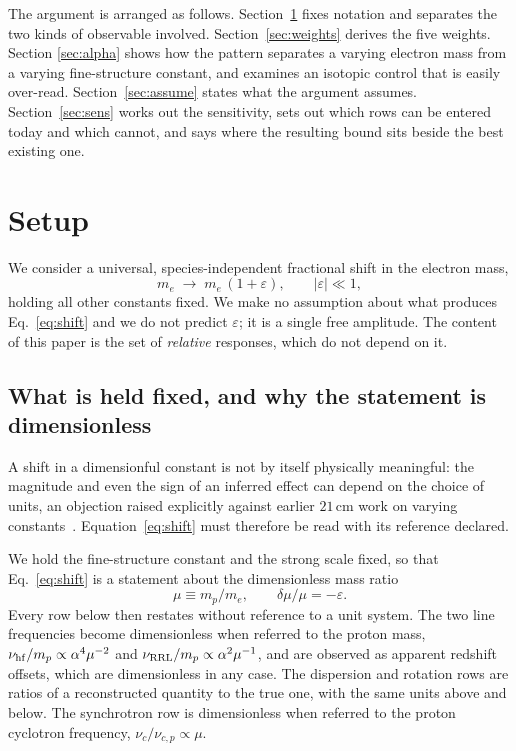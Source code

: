 \documentclass[aps,prd,twocolumn,superscriptaddress,nofootinbib,10pt]{revtex4-2}
\begin{document}
The argument is arranged as follows. Section~\ref{sec:setup} fixes notation and separates the two
kinds of observable involved. Section~\ref{sec:weights} derives the five weights. Section
\ref{sec:alpha} shows how the pattern separates a varying electron mass from a varying
fine-structure constant, and examines an isotopic control that is easily over-read.
Section~\ref{sec:assume} states what the argument assumes. Section~\ref{sec:sens} works out the
sensitivity, sets out which rows can be entered today and which cannot, and says where the
resulting bound sits beside the best existing one.

\section{Setup}\label{sec:setup}

We consider a universal, species-independent fractional shift in the electron mass,
%
\begin{equation}
  m_e \;\longrightarrow\; m_e\,(1+\varepsilon), \qquad |\varepsilon| \ll 1 ,
  \label{eq:shift}
\end{equation}
%
holding all other constants fixed. We make no assumption about what produces
Eq.~\eqref{eq:shift} and we do not predict $\varepsilon$; it is a single free amplitude. The
content of this paper is the set of \emph{relative} responses, which do not depend on it.

\subsection{What is held fixed, and why the statement is dimensionless}

A shift in a dimensionful constant is not by itself physically meaningful: the magnitude and even
the sign of an inferred effect can depend on the choice of units, an objection raised explicitly
against earlier $21\,$cm work on varying constants~\cite{FlambaumPorsev2010,KhatriWandelt2007,
KhatriWandelt2010}. Equation~\eqref{eq:shift} must therefore be read with its reference declared.

We hold the fine-structure constant and the strong scale fixed, so that Eq.~\eqref{eq:shift} is a
statement about the dimensionless mass ratio
%
\begin{equation}
  \mu \equiv m_p/m_e, \qquad \delta\mu/\mu = -\varepsilon .
  \label{eq:mu}
\end{equation}
%
Every row below then restates without reference to a unit system. The two line frequencies become
dimensionless when referred to the proton mass, $\nu_{\rm hf}/m_p \propto \alpha^{4}\mu^{-2}$ and
$\nu_{\rm RRL}/m_p \propto \alpha^{2}\mu^{-1}$, and are observed as apparent redshift offsets, which
are dimensionless in any case. The dispersion and rotation rows are ratios of a reconstructed
quantity to the true one, with the same units above and below. The synchrotron row is dimensionless
when referred to the proton cyclotron frequency, $\nu_c/\nu_{c,p} \propto \mu$.
\end{document}
